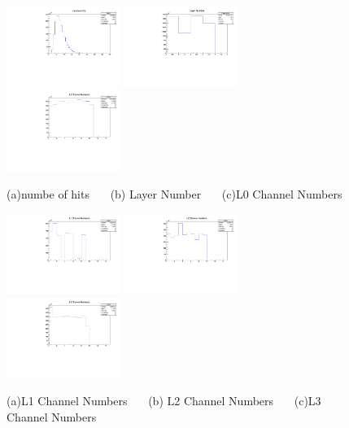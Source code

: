 \documentclass[a4paper,11pt]{article}
\theoremstyle{mytheor}
\begin{document}
\begin{figure}[H] 
\vspace*{-0.3cm} 
\includegraphics[width=0.33\textwidth,scale=0.5,trim=0 0 0 0,clip]{plotsdir/file0_test-nHits-1.pdf} 
\includegraphics[width=0.33\textwidth,scale=0.5,trim=0 0 0 0,clip]{plotsdir/file0_test-LayerNum-1.pdf} 
\includegraphics[width=0.33\textwidth,scale=0.5,trim=0 0 0 0,clip]{plotsdir/file0_test-L0Ch-1.pdf} 
\caption{(a)numbe of hits ~~~(b) Layer Number ~~~(c)L0 Channel Numbers } 
\end{figure} 
\begin{figure}[H] 
\vspace*{-0.3cm} 
\includegraphics[width=0.33\textwidth,scale=0.5,trim=0 0 0 0,clip]{plotsdir/file0_test-L1Ch-1.pdf} 
\includegraphics[width=0.33\textwidth,scale=0.5,trim=0 0 0 0,clip]{plotsdir/file0_test-L2Ch-1.pdf} 
\includegraphics[width=0.33\textwidth,scale=0.5,trim=0 0 0 0,clip]{plotsdir/file0_test-L3Ch-1.pdf} 
\caption{(a)L1 Channel Numbers ~~~(b) L2 Channel Numbers ~~~(c)L3 Channel Numbers } 
\end{figure} 
\end{document}
